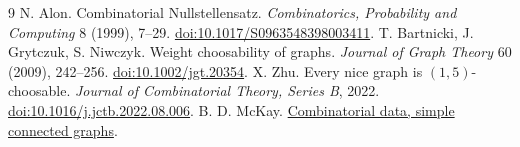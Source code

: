 \documentclass[10pt]{article}
\begin{document}
\begin{thebibliography}{9}
 N. Alon. Combinatorial Nullstellensatz. \emph{Combinatorics,
Probability and Computing} 8 (1999), 7--29.
\href{https://doi.org/10.1017/S0963548398003411}{doi:10.1017/S0963548398003411}.
 T. Bartnicki, J. Grytczuk, S. Niwczyk. Weight choosability
of graphs. \emph{Journal of Graph Theory} 60 (2009), 242--256.
\href{https://doi.org/10.1002/jgt.20354}{doi:10.1002/jgt.20354}.
 X. Zhu. Every nice graph is $(1,5)$-choosable.
\emph{Journal of Combinatorial Theory, Series B}, 2022.
\href{https://doi.org/10.1016/j.jctb.2022.08.006}{doi:10.1016/j.jctb.2022.08.006}.
 B. D. McKay. \href{https://users.cecs.anu.edu.au/~bdm/data/graphs.html}
{Combinatorial data, simple connected graphs}.
\end{thebibliography}
\end{document}
